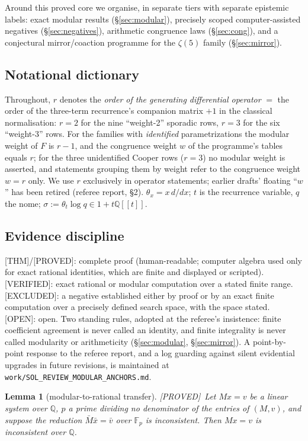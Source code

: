 \documentclass[11pt,reqno]{amsart}
\theoremstyle{plain}
\newtheorem{lemma}[theorem]{Lemma}
\theoremstyle{definition}
\theoremstyle{remark}
\newcommand{\Q}{\mathbb{Q}}
\newcommand{\tht}{\theta_t}
\newcommand{\Thm}{\textup{\textsf{[THM]}}}
\newcommand{\Proved}{\textup{\textsf{[PROVED]}}}
\newcommand{\Verified}{\textup{\textsf{[VERIFIED]}}}
\newcommand{\Excluded}{\textup{\textsf{[EXCLUDED]}}}
\newcommand{\Open}{\textup{\textsf{[OPEN]}}}
\begin{document}
Around this proved core we organise, in separate tiers with separate
epistemic labels: exact modular results (\S\ref{sec:modular}), precisely
scoped computer-assisted negatives (\S\ref{sec:negatives}), arithmetic
congruence laws (\S\ref{sec:cong}), and a conjectural mirror/coaction
programme for the $\zeta(5)$ family (\S\ref{sec:mirror}).

\subsection{Notational dictionary}\label{sec:dict}
Throughout, $r$ denotes the \emph{order of the generating differential
operator} $=$ the order of the three-term recurrence's companion matrix
$+1$ in the classical normalisation: $r=2$ for the nine ``weight-2''
sporadic rows, $r=3$ for the six ``weight-3'' rows. For the families with
\emph{identified} parametrizations the modular weight of $F$ is $r-1$, and
the congruence weight $w$ of the programme's tables equals $r$; for the
three unidentified Cooper rows ($r=3$) no modular weight is asserted, and
statements grouping them by weight refer to the congruence weight $w=r$
only. We use $r$ exclusively in operator
statements; earlier drafts' floating ``$w$'' has been retired
(referee report, \S2). $\theta_x=x\,d/dx$; $t$ is the recurrence variable,
$q$ the nome; $\sigma:=\tht\log q\in1+t\Q[[t]]$.

\subsection{Evidence discipline}\label{sec:labels}
\Thm/\Proved: complete proof (human-readable; computer algebra used only
for exact rational identities, which are finite and displayed or scripted).
\Verified: exact rational or modular computation over a stated finite
range. \Excluded: a negative established either by proof or by an exact
finite computation over a precisely defined search space, with the space
stated. \Open: open. Two standing rules, adopted at the referee's
insistence: finite coefficient agreement is never called an identity, and
finite integrality is never called modularity or arithmeticity
(\S\ref{sec:modular}, \S\ref{sec:mirror}). A point-by-point response to
the referee report, and a log guarding against silent evidential
upgrades in future revisions, is maintained at
\texttt{work/SOL\_REVIEW\_MODULAR\_ANCHORS.md}.

\begin{lemma}[modular-to-rational transfer]\label{lem:modrat}
\Proved\
Let $Mx=v$ be a linear system over $\Q$, $p$ a prime dividing no
denominator of the entries of $(M,v)$, and suppose the reduction
$\bar M\bar x=\bar v$ over $\mathbb F_p$ is inconsistent. Then $Mx=v$ is
inconsistent over $\Q$.
\end{lemma}
\end{document}
